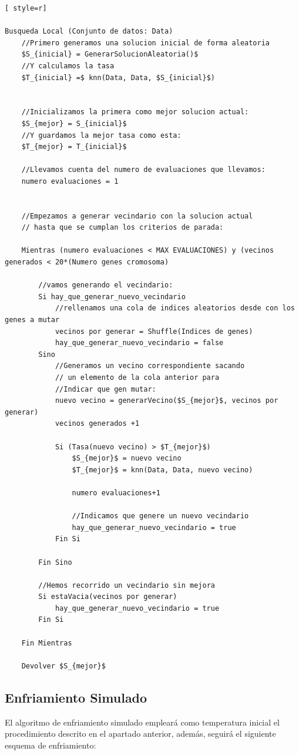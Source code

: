 \begin{lstlisting}[ style=r]

Busqueda Local (Conjunto de datos: Data)
	//Primero generamos una solucion inicial de forma aleatoria
	$S_{inicial} = GenerarSolucionAleatoria()$
	//Y calculamos la tasa
	$T_{inicial} =$ knn(Data, Data, $S_{inicial}$)
	
	
	//Inicializamos la primera como mejor solucion actual:
	$S_{mejor} = S_{inicial}$
	//Y guardamos la mejor tasa como esta:
	$T_{mejor} = T_{inicial}$
	
	//Llevamos cuenta del numero de evaluaciones que llevamos:
	numero evaluaciones = 1
	
	
	//Empezamos a generar vecindario con la solucion actual 
	// hasta que se cumplan los criterios de parada:

	Mientras (numero evaluaciones < MAX EVALUACIONES) y (vecinos generados < 20*(Numero genes cromosoma)
	
		//vamos generando el vecindario:
		Si hay_que_generar_nuevo_vecindario
			//rellenamos una cola de indices aleatorios desde con los genes a mutar
			vecinos por generar = Shuffle(Indices de genes)
			hay_que_generar_nuevo_vecindario = false
		Sino
			//Generamos un vecino correspondiente sacando
			// un elemento de la cola anterior para
			//Indicar que gen mutar:
			nuevo vecino = generarVecino($S_{mejor}$, vecinos por generar)
			vecinos generados +1
			
			Si (Tasa(nuevo vecino) > $T_{mejor}$)
				$S_{mejor}$ = nuevo vecino
				$T_{mejor}$ = knn(Data, Data, nuevo vecino)
				
				numero evaluaciones+1
				
				//Indicamos que genere un nuevo vecindario
				hay_que_generar_nuevo_vecindario = true
			Fin Si
			
		Fin Sino
		
		//Hemos recorrido un vecindario sin mejora
		Si estaVacia(vecinos por generar)
			hay_que_generar_nuevo_vecindario = true
		Fin Si
		
	Fin Mientras
	
	Devolver $S_{mejor}$
\end{lstlisting}


\subsection{Enfriamiento Simulado}
El algoritmo de enfriamiento simulado empleará como temperatura inicial el procedimiento descrito en el apartado anterior, además, seguirá el siguiente esquema de enfriamiento:
